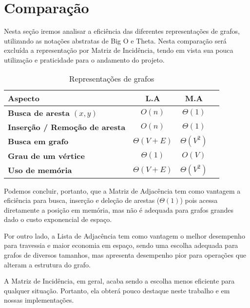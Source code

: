\section{Comparação}
Nesta seção iremos analisar a eficiência das diferentes representações de grafos, utilizando as notações abstratas de Big O e Theta.
Nesta comparação será excluída a representação por Matriz de Incidência, tendo em vista sua pouca utilização e praticidade para o andamento do projeto.
\begin{table}[H]
\centering
\caption{Representações de grafos}
\begin{tabular}{|l|c|c|c|}
\hline
\textbf{Aspecto} & \textbf{L.A} & \textbf{M.A} \\ \hline
\textbf{Busca de aresta} $(x, y)$ & $O(n)$ & $\Theta(1)$  \\ \hline
\textbf{Inserção / Remoção de aresta} & $O(n)$ & $\Theta(1)$  \\ \hline
\textbf{Busca em grafo} & $\Theta(V + E)$ & $\Theta(V^2)$  \\ \hline
\textbf{Grau de um vértice} & $\Theta(1)$ & $O(V)$ \\ \hline
\textbf{Uso de memória} & $\Theta(V + E)$ & $\Theta(V^2)$ \\ \hline
\end{tabular}
\vspace{0.3em}
\end{table}

Podemos concluir, portanto, que a Matriz de Adjacência tem como vantagem a eficiência para busca, inserção e deleção de arestas ($\Theta(1)$) pois acessa diretamente a posição em memória, mas não é adequada para grafos grandes dado o custo exponencial de espaço.

Por outro lado, a Lista de Adjacência tem como vantagem o melhor desempenho para travessia e maior economia em espaço, sendo uma escolha adequada para grafos de diversos tamanhos, mas apresenta desempenho pior para operações que alteram a estrutura do grafo.

A Matriz de Incidência, em geral, acaba sendo a escolha menos eficiente para qualquer situação. Portanto, ela obterá pouco destaque neste trabalho e em nossas implementações.
